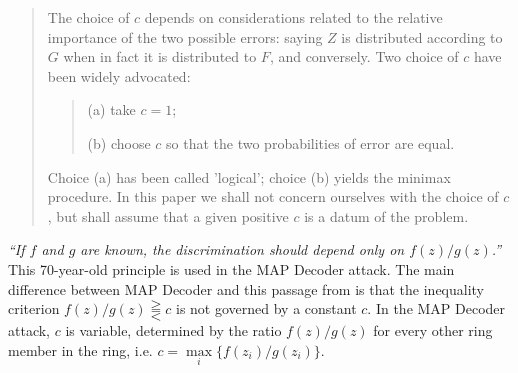 \documentclass[english]{article}
\begin{document}
\begin{quote}
The choice of $c$ depends on considerations related to the relative
importance of the two possible errors: saying $Z$ is distributed
according to $G$ when in fact it is distributed to $F$, and conversely.
Two choice of $c$ have been widely advocated:
\begin{quote}
(a) take $c=1$;

(b) choose $c$ so that the two probabilities of error are equal.
\end{quote}
Choice (a) has been called 'logical'; choice (b) yields the minimax
procedure. In this paper we shall not concern ourselves with the choice
of $c$, but shall assume that a given positive $c$ is a datum of
the problem.
\end{quote}
\textit{``If $f$ and $g$ are known, the discrimination should depend
only on $f(z)/g(z)$.'' }This 70-year-old principle is used in the
MAP Decoder attack. The main difference between MAP Decoder and this
passage from \cite{FixHodges1989} is that the inequality criterion
$f(z)/g(z)\gtreqqless c$ is not governed by a constant $c$. In the
MAP Decoder attack, $c$ is variable, determined by the ratio $f(z)/g(z)$
for every other ring member in the ring, i.e. $c=\underset{i}{\max}\{f(z_{i})/g(z_{i})\}$.
\end{document}

